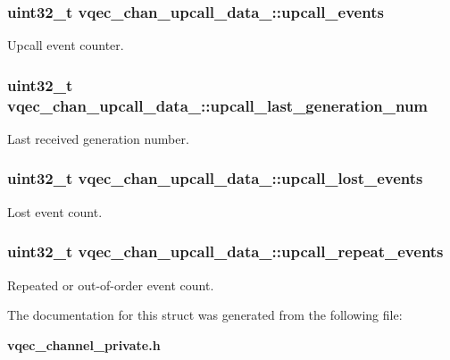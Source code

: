 \subsubsection{\setlength{\rightskip}{0pt plus 5cm}uint32\_\-t \bf{vqec\_\-chan\_\-upcall\_\-data\_\-::upcall\_\-events}}\label{structvqec__chan__upcall__data___be018f6255f32b5f9249f54819239cf6}


Upcall event counter. 
\subsubsection{\setlength{\rightskip}{0pt plus 5cm}uint32\_\-t \bf{vqec\_\-chan\_\-upcall\_\-data\_\-::upcall\_\-last\_\-generation\_\-num}}\label{structvqec__chan__upcall__data___b0931a9a05d68a2115213fec8427c10f}


Last received generation number. 
\subsubsection{\setlength{\rightskip}{0pt plus 5cm}uint32\_\-t \bf{vqec\_\-chan\_\-upcall\_\-data\_\-::upcall\_\-lost\_\-events}}\label{structvqec__chan__upcall__data___c96199be2ffc7c158e5794039be03aad}


Lost event count. 
\subsubsection{\setlength{\rightskip}{0pt plus 5cm}uint32\_\-t \bf{vqec\_\-chan\_\-upcall\_\-data\_\-::upcall\_\-repeat\_\-events}}\label{structvqec__chan__upcall__data___dbbca5031b31e18647918d889ccf05b3}


Repeated or out-of-order event count. 

The documentation for this struct was generated from the following file:\begin{CompactItemize}
\item 
\bf{vqec\_\-channel\_\-private.h}\end{CompactItemize}

